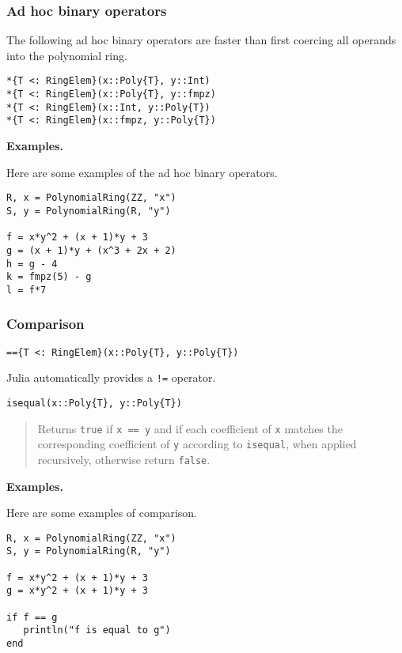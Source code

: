 \documentclass[a4paper,10pt]{article}
\newcommand{\code}{\lstinline}
\newcommand{\desc}[1]{\vspace{-3mm}\begin{quote}#1\end{quote}}
\begin{document}
\subsubsection{Ad hoc binary operators}

The following ad hoc binary operators are faster than first coercing all
operands into the polynomial ring.

\begin{lstlisting}
*{T <: RingElem}(x::Poly{T}, y::Int)
*{T <: RingElem}(x::Poly{T}, y::fmpz)
*{T <: RingElem}(x::Int, y::Poly{T})
*{T <: RingElem}(x::fmpz, y::Poly{T})
\end{lstlisting}

\textbf{Examples.}

Here are some examples of the ad hoc binary operators.

\begin{lstlisting}
R, x = PolynomialRing(ZZ, "x")
S, y = PolynomialRing(R, "y")

f = x*y^2 + (x + 1)*y + 3
g = (x + 1)*y + (x^3 + 2x + 2)
h = g - 4
k = fmpz(5) - g
l = f*7
\end{lstlisting}

\subsubsection{Comparison}

\begin{lstlisting}
=={T <: RingElem}(x::Poly{T}, y::Poly{T})
\end{lstlisting}

Julia automatically provides a \code{!=} operator.

\begin{lstlisting}
isequal(x::Poly{T}, y::Poly{T})
\end{lstlisting}

\desc{Returns \code{true} if \code{x == y} and if each coefficient of \code{x}
matches the corresponding coefficient of \code{y} according to \code{isequal},
when applied recursively, otherwise return \code{false}.}

\textbf{Examples.}

Here are some examples of comparison.

\begin{lstlisting}
R, x = PolynomialRing(ZZ, "x")
S, y = PolynomialRing(R, "y")

f = x*y^2 + (x + 1)*y + 3
g = x*y^2 + (x + 1)*y + 3

if f == g
   println("f is equal to g")
end
\end{lstlisting}
\end{document}
